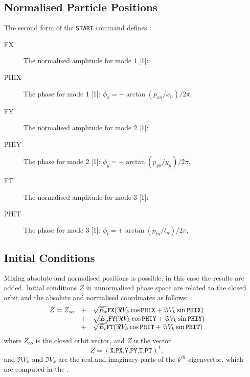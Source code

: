 \subsection{Normalised Particle Positions}
The second form of the \texttt{START} command defines 
:
\begin{description}
\item[FX]
  The normalised amplitude for mode 1 [1]:
\item[PHIX]
  The phase for mode 1 [1]:
  $\phi_x = - \arctan(p_{xn}/x_n) / 2 \pi$,
\item[FY]
  The normalised amplitude for mode 2 [1]:
\item[PHIY]
  The phase for mode 2 [1]:
  $\phi_y = - \arctan(p_{yn}/y_n) / 2 \pi$,
\item[FT]
  The normalised amplitude for mode 3 [1]:
\item[PHIT]
  The phase for mode 3 [1]:
  $\phi_t = + \arctan(p_{tn}/t_n) / 2 \pi$,
\end{description}

\subsection{Initial Conditions}
Mixing absolute and normalised positions is possible,
in this case the results are added.
Initial conditions $Z$ in unnormalised phase space are related 
to the closed orbit and the absolute and normalised coordinates as follows:
\[
\begin{array}{rcl}
  Z = Z_{co}&+& \sqrt{E_x} \hbox{\tt FX}
  (\Re V_k \cos \hbox{\tt PHIX} + \Im V_k \sin \hbox{\tt PHIX}) \\
  &+& \sqrt{E_y} \hbox{\tt FY}
  (\Re V_k \cos \hbox{\tt PHIY} + \Im V_k \sin \hbox{\tt PHIY}) \\
  &+& \sqrt{E_t} \hbox{\tt FT}
  (\Re V_k \cos \hbox{\tt PHIT} + \Im V_k \sin \hbox{\tt PHIT})
\end{array}
\]
where $Z_{co}$ is the closed orbit vector, and $Z$ is the vector 
\[
Z = (\texttt{X,PX,Y,PY,T,PT})^T,
\]
and $\Re V_k$ and $\Im V_k$ are the real and imaginary parts of the 
$k^{th}$ eigenvector,
which are computed in the .

